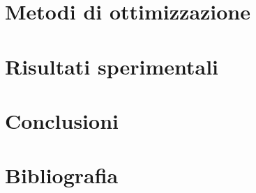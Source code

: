 \documentclass[a4paper, 12pt]{book}
\numberwithin{equation}{section}
\numberwithin{figure}{section}
\numberwithin{table}{section}
\begin{document}
	\clearpage{\pagestyle{plain}\cleardoublepage} %
	\chapter{Metodi di ottimizzazione} %
	\label{chapter:quarto} %

	\clearpage{\pagestyle{plain}\cleardoublepage} %
	\chapter{Risultati sperimentali} %
	\label{chapter:quinto} %
	
	\clearpage{\pagestyle{plain}\cleardoublepage} %
	\chapter{Conclusioni} %
	\label{chapter:sesto} %

	\pagestyle{plain}
	\cleardoublepage
	\chapter*{Bibliografia} %
	\printbibliography[heading=none]
\end{document}
